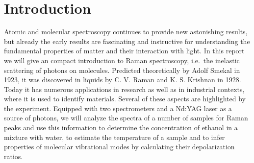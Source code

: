 \section{Introduction}
Atomic and molecular spectroscopy continues to provide new astonishing results, but already the early results are fascinating
and instructive for understanding the fundamental properties of matter and their interaction with light.
In this report we will give an compact introduction to Raman spectroscopy,
i.e.\ the inelastic scattering of photons on molecules. Predicted theoretically 
by Adolf Smekal in 1923, it was discovered in liquids by C. V. Raman and K. S. Krishnan in 1928\cite{venkataraman}. 
Today it has numerous applications in research as well as in industrial contexts, where it is used to identify materials. 
Several of these aspects are highlighted by the experiment. Equipped with two spectrometers and a Nd:YAG laser as a source
of photons, we will analyze the spectra of a number of samples for Raman peaks and use this information to determine the 
concentration of ethanol in a mixture with water, to estimate the temperature of a sample and to infer properties of 
molecular vibrational modes by calculating their depolarization ratios. 

